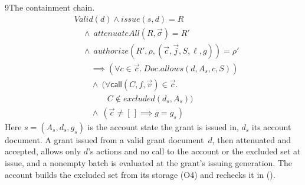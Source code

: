 \begin{perchstatement}{9}{The containment chain.}\label{stmt:the-containment-chain}
\[\begin{aligned}&\mathit{Valid}(d) \land \mathit{issue}(s, d) = R\\
&\quad \land\ \mathit{attenuateAll}(R, \vec\sigma) = R'\\
&\quad \land\ \mathit{authorize}(R', \rho, (\vec c, \vec j, S, \ell, g)) = \rho'\\
&\qquad \implies (\forall c \in \vec c.\ \mathit{Doc.allows}(d, A_s, c, S))\\
&\qquad \land\ (\forall \mathsf{call}(C, f, \vec v) \in \vec c.\\
&\qquad\qquad C \notin \mathit{excluded}(d_s, A_s))\\
&\qquad \land\ (\vec c \neq [\,] \implies g = g_s)\end{aligned}\]
Here $s = (A_s, d_s, g_s)$ is the account state the grant is issued in, $d_s$ its account document. A grant issued from a valid grant document~$d$, then attenuated and accepted, allows only $d$'s actions and no call to the account or the excluded set at issue, and a nonempty batch is evaluated at the grant's issuing generation. The account builds the excluded set from its storage (O4) and rechecks it in  ().
\end{perchstatement}
